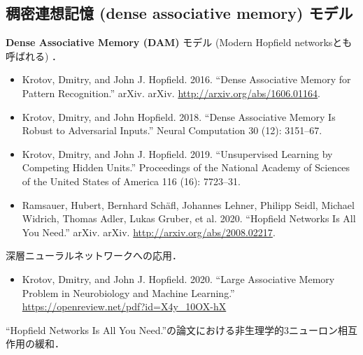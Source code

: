 \subsection{稠密連想記憶 (dense associative memory) モデル}
\textbf{Dense Associative Memory (DAM)} モデル (Modern Hopfield networksとも呼ばれる) ．
\begin{itemize}
\item Krotov, Dmitry, and John J. Hopfield. 2016. “Dense Associative Memory for Pattern Recognition.” arXiv. arXiv. \url{http://arxiv.org/abs/1606.01164}.
\item Krotov, Dmitry, and John Hopfield. 2018. “Dense Associative Memory Is Robust to Adversarial Inputs.” Neural Computation 30 (12): 3151–67.
\item Krotov, Dmitry, and John J. Hopfield. 2019. “Unsupervised Learning by Competing Hidden Units.” Proceedings of the National Academy of Sciences of the United States of America 116 (16): 7723–31.
\end{itemize}
\begin{itemize}
\item Ramsauer, Hubert, Bernhard Schäfl, Johannes Lehner, Philipp Seidl, Michael Widrich, Thomas Adler, Lukas Gruber, et al. 2020. “Hopfield Networks Is All You Need.” arXiv. arXiv. \url{http://arxiv.org/abs/2008.02217}.
\end{itemize}
深層ニューラルネットワークへの応用．
\begin{itemize}
\item Krotov, Dmitry, and John J. Hopfield. 2020. “Large Associative Memory Problem in Neurobiology and Machine Learning.” \url{https://openreview.net/pdf?id=X4y_10OX-hX}
\end{itemize}
“Hopfield Networks Is All You Need.”の論文における非生理学的3ニューロン相互作用の緩和．

